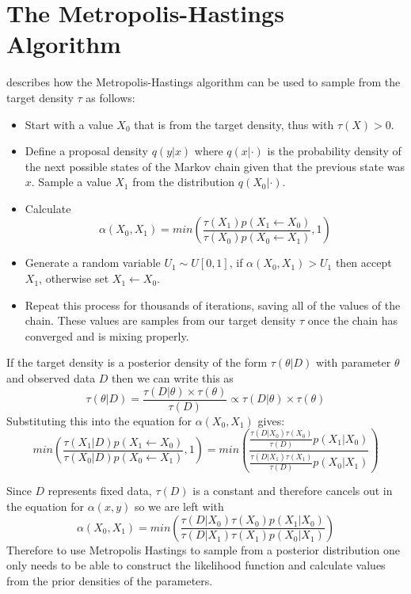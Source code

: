 \documentclass[11pt,a4paper]{report}
\begin{document}
\section{The Metropolis-Hastings Algorithm}
\citet{Voss14} describes how the Metropolis-Hastings algorithm can be used to sample from the target density $\tau$ as follows:
\begin{itemize}
\item Start with a value $X_0$ that is from the target density, thus with $\tau(X) > 0$.
\item Define a proposal density $q(y|x)$ where $q(x | \cdot)$ is the probability density of the next possible states of the Markov chain given that the previous state was $x$. Sample a value $X_1$ from the distribution $q(X_0|\cdot)$.
\item Calculate 
\begin{equation}
\alpha(X_0,X_1) = min\left(\frac{\tau(X_1)p(X_1 \leftarrow X_0)}{\tau(X_0)p(X_0 \leftarrow X_1)},1\right)
\end{equation}
\item Generate a random variable $U_1 \sim U[0,1]$, if $\alpha(X_0,X_1) > U_1$ then accept $X_1$, otherwise set $X_1 \leftarrow X_0$.
\item Repeat this process for thousands of iterations, saving all of the values of the chain. These values are samples from our target density $\tau$ once the chain has converged and is mixing properly.
\end{itemize}
If the target density is a posterior density of the form $\tau(\theta | D)$ with parameter $\theta$ and observed data $D$ then we can write this as
\begin{equation}
\tau(\theta | D) = \frac{\tau(D | \theta) \times \tau(\theta)}{\tau(D)} \propto \tau(D | \theta) \times \tau(\theta)
\end{equation}
Substituting this into the equation for $\alpha(X_0,X_1)$ gives:
\begin{equation}
min\left(\frac{\tau(X_1|D)p(X_1 \leftarrow X_0)}{\tau(X_0|D)p(X_0 \leftarrow X_1)},1\right)= min\left(\frac{\frac{\tau(D | X_0)\tau(X_0)}{\tau(D)}p(X_1|X_0)}{\frac{\tau(D | X_1)\tau(X_1)}{\tau(D)}p(X_0|X_1)}\right)
\end{equation}

Since $D$ represents fixed data, $\tau(D)$ is a constant and therefore cancels out in the equation for $\alpha(x,y)$ so we are left with
\begin{equation}
\alpha(X_0,X_1) = min\left(\frac{\tau(D | X_0)\tau(X_0)p(X_1|X_0)}{\tau(D | X_1)\tau(X_1)p(X_0|X_1)}\right)
\end{equation}
Therefore to use Metropolis Hastings to sample from a posterior distribution one only needs to be able to construct the likelihood function and calculate values from the prior densities of the parameters.
\end{document}
